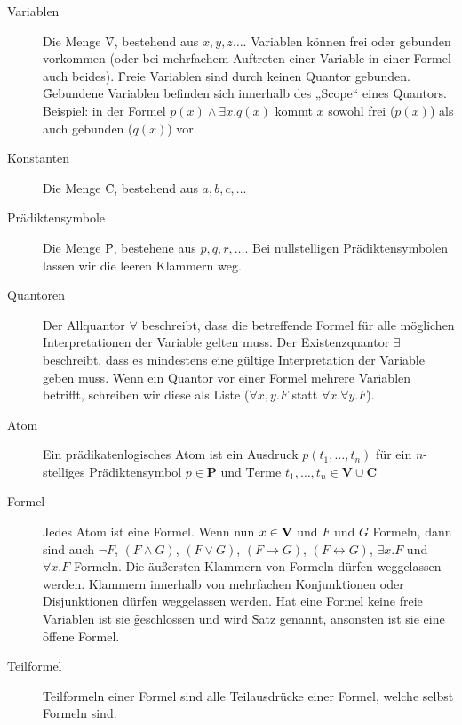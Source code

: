     \begin{description}
        \item[Variablen] Die Menge \f{V}, bestehend aus $x, y, z\dots$. Variablen können frei oder gebunden vorkommen (oder bei mehrfachem Auftreten einer Variable in einer Formel auch beides). \f{Freie} Variablen sind durch keinen Quantor gebunden. \f{Gebundene} Variablen befinden sich innerhalb des „Scope“ eines Quantors. Beispiel: in der Formel $p(x) \land \exists x.q(x)$ kommt $x$ sowohl frei ($p(x)$) als auch gebunden ($q(x)$) vor.

        \item[Konstanten] Die Menge \f{C}, bestehend aus $a,b,c,\dots${}

        \item[Prädiktensymbole] Die Menge \f{P}, bestehene aus $p,q,r,\dots${}. Bei nullstelligen Prädiktensymbolen lassen wir die leeren Klammern weg.

        \item[Quantoren] Der Allquantor $\forall$ beschreibt, dass die betreffende Formel für alle möglichen Interpretationen der Variable gelten muss. Der Existenzquantor $\exists$ beschreibt, dass es mindestens eine gültige Interpretation der Variable geben muss. Wenn ein Quantor vor einer Formel mehrere Variablen betrifft, schreiben wir diese als Liste ($\forall x,y.F$ statt $\forall x.\forall y.F$).

        \item[Atom] Ein prädikatenlogisches Atom ist ein Ausdruck $p(t_{1},\dots,t_{n})$ für ein $n$-stelliges Prädiktensymbol $p \in \mathbf{P}$ und \f{Terme} $t_{1},\dots,t_{n} \in \mathbf{V} \cup \mathbf{C}$

        \item[Formel] Jedes Atom ist eine Formel. Wenn nun $x\in\textbf{V}$ und $F$ und $G$ Formeln, dann sind auch $\neg F$, $(F\land G)$, $(F\lor G)$, $(F\to G)$, $(F\leftrightarrow G)$, $\exists x.F$ und $\forall x.F$ Formeln. Die äußersten Klammern von Formeln dürfen weggelassen werden. Klammern innerhalb von mehrfachen Konjunktionen oder Disjunktionen dürfen weggelassen werden. Hat eine Formel keine freie Variablen ist sie \f{geschlossen} und wird \f{Satz} genannt, ansonsten ist sie eine \f{offene} Formel.

        \item[Teilformel] Teilformeln einer Formel sind alle Teilausdrücke einer Formel, welche selbst Formeln sind.
    \end{description}
